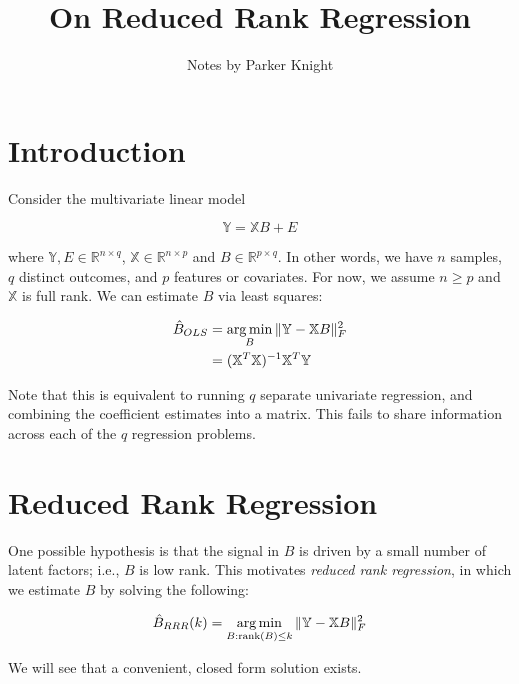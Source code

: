 \documentclass{article}
\title{On Reduced Rank Regression}
\author{Notes by Parker Knight}
\newcommand{\rank}{\textrm{rank}}
\newcommand{\R}{\mathbb{R}}
\newcommand{\X}{\mathbb{X}}
\newcommand{\Y}{\mathbb{Y}}
\newcommand{\argmin}{\mathop{\rm arg\,min}}
\begin{document}
\maketitle

\section{Introduction}

Consider the multivariate linear model

$$\Y = \X B + E$$

where $\Y,E \in \R^{n \times q}$, $\X \in \R^{n \times p}$ and $B \in \R^{p
\times q}$. In other words, we have $n$ samples, $q$ distinct outcomes, and $p$
features or covariates. For now, we assume $n \geq p$ and $\X$ is full rank. We
can estimate $B$ via least squares:

\begin{align*}
	\hat{B}_{OLS} &= \argmin_{B}\|\Y - \X B \|_F^2 \\
	&= (\X^T\X)^{-1}\X^T\Y
\end{align*}

Note that this is equivalent to running $q$ separate univariate regression, and
combining the coefficient estimates into a matrix. This fails to share
information across each of the $q$ regression problems. 

\section{Reduced Rank Regression}

One possible hypothesis is that
the signal in $B$ is driven by a small number of latent factors; i.e., $B$ is
low rank. This motivates \textit{reduced rank regression}, in which we estimate
$B$ by solving the following:

$$\hat{B}_{RRR}(k) = \argmin_{B: \rank(B) \leq k}\|\Y - \X B \|_F^2$$

We will see that a convenient, closed form solution exists.
\end{document}
